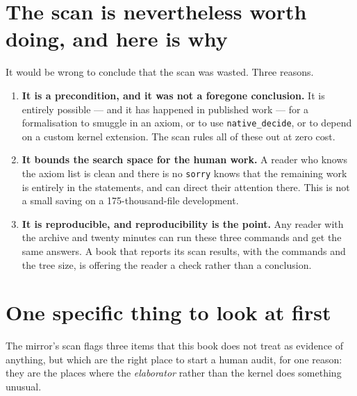 \section{The scan is nevertheless worth doing, and here is why}It would be wrong to conclude that the scan was wasted. Three reasons.

\begin{enumerate}
\item \textbf{It is a precondition, and it was not a foregone conclusion.} It
is entirely possible --- and it has happened in published work --- for a
formalisation to smuggle in an axiom, or to use \texttt{native\_decide}, or
to depend on a custom kernel extension. The scan rules all of these out at
zero cost.

\item \textbf{It bounds the search space for the human work.} A reader who
knows the axiom list is clean and there is no \texttt{sorry} knows that the
remaining work is entirely in the statements, and can direct their attention
there. This is not a small saving on a 175-thousand-file development.

\item \textbf{It is reproducible, and reproducibility is the point.} Any
reader with the archive and twenty minutes can run these three commands and
get the same answers. A book that reports its scan results, with the commands
and the tree size, is offering the reader a check rather than a conclusion.
\end{enumerate}

\section{One specific thing to look at first}The mirror's scan flags three items that this book does not treat as evidence
of anything, but which are the right place to start a human audit, for one
reason: they are the places where the \emph{elaborator} rather than the
kernel does something unusual.

